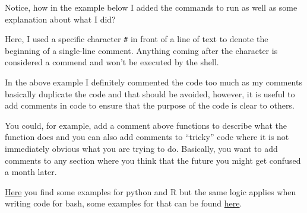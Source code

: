 \documentclass[
  letterpaper,
  DIV=11,
  numbers=noendperiod]{scrreprt}
\begin{document}
\begin{tcolorbox}[enhanced jigsaw, bottomtitle=1mm, colframe=quarto-callout-tip-color-frame, left=2mm, leftrule=.75mm, coltitle=black, colbacktitle=quarto-callout-tip-color!10!white, toprule=.15mm, rightrule=.15mm, opacityback=0, titlerule=0mm, colback=white, breakable, bottomrule=.15mm, title=\textcolor{quarto-callout-tip-color}{\faLightbulb}\hspace{0.5em}{Tip: commenting your code}, arc=.35mm, toptitle=1mm, opacitybacktitle=0.6]

Notice, how in the example below I added the commands to run as well as
some explanation about what I did?

Here, I used a specific character \texttt{\#} in front of a line of text
to denote the beginning of a single-line comment. Anything coming after
the character is considered a commend and won't be executed by the
shell.

In the above example I definitely commented the code too much as my
comments basically duplicate the code and that should be avoided,
however, it is useful to add comments in code to ensure that the purpose
of the code is clear to others.

You could, for example, add a comment above functions to describe what
the function does and you can also add comments to ``tricky'' code where
it is not immediately obvious what you are trying to do. Basically, you
want to add comments to any section where you think that the future you
might get confused a month later.

\href{https://best-practice-and-impact.github.io/qa-of-code-guidance/code_documentation.html}{Here}
you find some examples for python and R but the same logic applies when
writing code for bash, some examples for that can be found
\href{https://linuxize.com/post/bash-comments/}{here}.

\end{tcolorbox}
\end{document}
